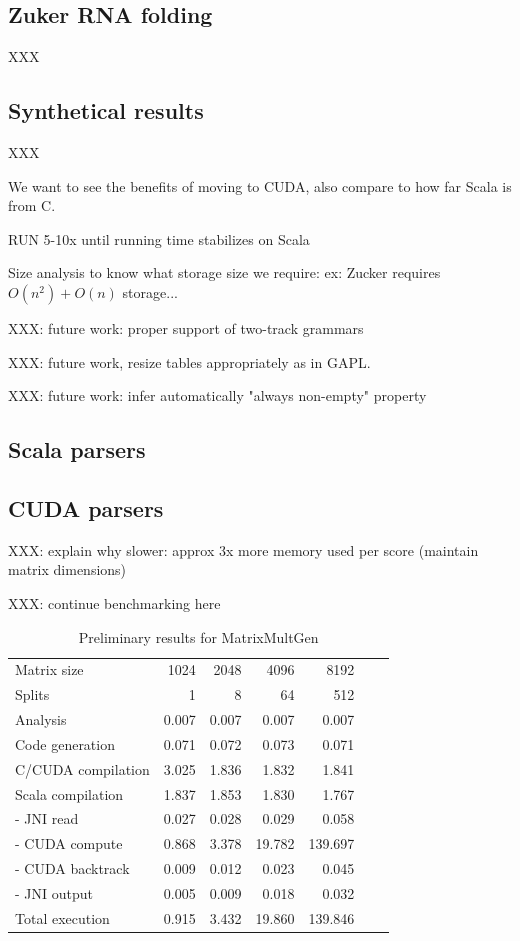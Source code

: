 \subsection{Zuker RNA folding}
XXX

\subsection{Synthetical results}
XXX

{\color{red} We want to see the benefits of moving to CUDA, also compare to how far Scala is from C.}

RUN 5-10x until running time stabilizes on Scala

 {\color{red} Size analysis to know what storage size we require: ex: Zucker requires $O(n^2)+O(n)$ storage...}

XXX: future work: proper support of two-track grammars

XXX: future work, resize tables appropriately as in GAPL.

XXX: future work: infer automatically "always non-empty" property

\subsection{Scala parsers}

\subsection{CUDA parsers}
{\color{red} XXX: explain why slower: approx 3x more memory used per score (maintain matrix dimensions)

XXX: continue benchmarking here
}
\begin{table}[H]\begin{center}\begin{tabular}{lrrrrrr} \toprule
Matrix size			& 1024	& 2048	& 4096	& 8192 \\
Splits				& 1		& 8		& 64		& 512 \\ \midrule
Analysis				& 0.007	& 0.007	& 0.007	& 0.007 \\
Code generation		& 0.071	& 0.072	& 0.073	& 0.071 \\
C/CUDA compilation	& 3.025	& 1.836	& 1.832	& 1.841 \\
Scala compilation		& 1.837	& 1.853	& 1.830	& 1.767 \\ \midrule
- JNI read				& 0.027	& 0.028	& 0.029	& 0.058 \\
- CUDA compute		& 0.868	& 3.378	& 19.782	& 139.697 \\
- CUDA backtrack		& 0.009	& 0.012	& 0.023	& 0.045 \\
- JNI output			& 0.005	& 0.009	& 0.018	& 0.032 \\
Total execution			& 0.915	& 3.432	& 19.860	& 139.846 \\ \bottomrule
\end{tabular}\end{center}\caption{Preliminary results for MatrixMultGen}\end{table}

